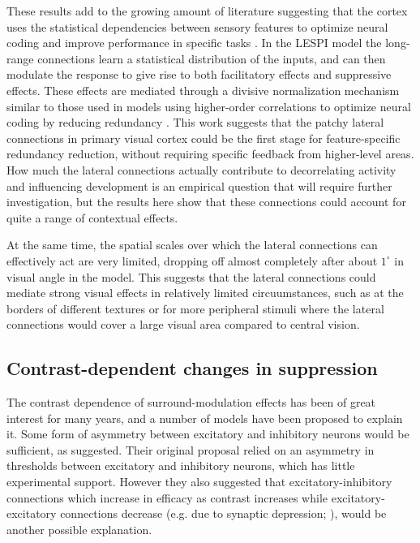 These results add to the growing amount of literature suggesting that
the cortex uses the statistical dependencies between sensory features
to optimize neural coding \citep{Vinje2000, Simoncelli2001} and
improve performance in specific tasks \citep{Geisler2001}. In the
LESPI model the long-range connections learn a statistical
distribution of the inputs, and can then modulate the response to give
rise to both facilitatory effects and suppressive effects. These
effects are mediated through a divisive normalization mechanism
similar to those used in models using higher-order correlations to
optimize neural coding by reducing redundancy \citep{Spratling2011,
  Coen2015}. This work suggests that the patchy lateral connections in
primary visual cortex could be the first stage for feature-specific
redundancy reduction, without requiring specific feedback from
higher-level areas. How much the lateral connections actually
contribute to decorrelating activity and influencing development is an
empirical question that will require further investigation, but the
results here show that these connections could account for quite a
range of contextual effects.

At the same time, the spatial scales over which the lateral connections
can effectively act are very limited, dropping off almost completely
after about $1^\circ$ in visual angle in the model. This suggests that
the lateral connections could mediate strong visual effects in
relatively limited circuumstances, such as at the borders of different
textures or for more peripheral stimuli where the lateral connections
would cover a large visual area compared to central vision.

\subsection{Contrast-dependent changes in suppression}

The contrast dependence of surround-modulation effects has been of
great interest for many years, and a number of models have been
proposed to explain it. Some form of asymmetry between
excitatory and inhibitory neurons would be sufficient, as \cite{Somers1998}
suggested. Their original proposal relied on an asymmetry in
thresholds between excitatory and inhibitory neurons, which has little
experimental support. However they also suggested that
excitatory-inhibitory connections which increase in efficacy as
contrast increases while excitatory-excitatory connections decrease
(e.g. due to synaptic depression; \citealt{Abbott1997, Tsodyks1997}),
would be another possible explanation.


